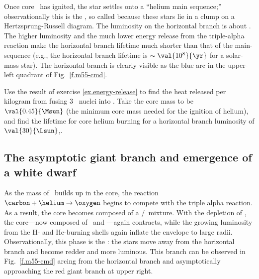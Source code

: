 Once core \helium\ has ignited, the star settles onto a ``helium main sequence;'' observationally this is the , so called because these stars lie in a clump on a Hertzsprung-Russell diagram. The luminosity on the horizontal branch is about . The higher luminosity and the much lower energy release from the triple-alpha reaction make the horizontal branch lifetime much shorter than that of the main-sequence (e.g., the horizontal branch lifetime is $\sim \val{10^{8}}{\yr}$ for a solar-mass star). The horizontal branch is clearly visible as the blue arc in the upper-left quadrant of Fig.~\ref{f.m55-cmd}.

\begin{exercisebox}
Use the result of exercise \ref{ex.energy-release} to find the heat released per kilogram from fusing 3 \helium\ nuclei into \carbon. Take the core mass to be $\val{0.45}{\Msun}$ (the minimum core mass needed for the ignition of helium), and find the lifetime for core helium burning for a horizontal branch luminosity of $\val{30}{\Lsun}$,.
\end{exercisebox}

\subsection{The asymptotic giant branch and emergence of a white dwarf}

As the mass of \carbon\ builds up in the core, the reaction $\carbon+\helium\to\oxygen$ begins to compete with the triple alpha reaction. As a result, the core becomes composed of a \carbon/\oxygen\ mixture.
With the depletion of \helium, the core---now composed of \carbon\ and \oxygen---again contracts, while the growing luminosity from the H- and He-burning shells again inflate the envelope to large radii. Observationally, this phase is the : the stars move away from the horizontal branch and become redder and more luminous. This branch can be observed in Fig.~\ref{f.m55-cmd} arcing from the horizontal branch and asymptotically approaching the red giant branch at upper right. 

